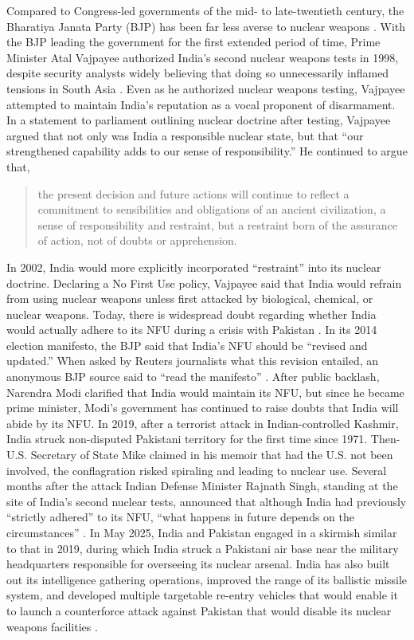 \documentclass[12pt]{article}
\begin{document}
Compared to Congress-led governments of the mid- to late-twentieth century, the Bharatiya Janata Party (BJP) has been far less averse to nuclear weapons \citep{hymans_psychology_2006}. With the BJP leading the government for the first extended period of time, Prime Minister Atal Vajpayee authorized India's second nuclear weapons tests in 1998, despite security analysts widely believing that doing so unnecessarily inflamed tensions in South Asia \citep{bajpai_indian_2014}. Even as he authorized nuclear weapons testing, Vajpayee attempted to maintain India's reputation as a vocal proponent of disarmament. In a statement to parliament outlining nuclear doctrine after testing, Vajpayee argued that not only was India a responsible nuclear state, but that “our strengthened capability adds to our sense of responsibility.” He continued to argue that, \blockquote{the present decision and future actions will  continue to reflect a commitment to sensibilities and  obligations of an ancient civilization, a sense of responsibility and restraint, but a restraint born of the assurance of action, not of doubts or apprehension.}

In 2002, India would more explicitly incorporated “restraint” into its nuclear doctrine. Declaring a No First Use policy, Vajpayee said that India would refrain from using nuclear weapons unless first attacked by biological, chemical, or nuclear weapons. Today, there is widespread doubt regarding whether India would actually adhere to its NFU during a crisis with Pakistan \citep{clary_indias_2019, sundaram_india_2018}. In its 2014 election manifesto, the BJP said that India's NFU should be “revised and updated.” When asked by Reuters journalists what this revision entailed, an anonymous BJP source said to “read the manifesto” \citep{sanjeev_miglani_indias_2014}. After public backlash, Narendra Modi clarified that India would maintain its NFU, but since he became prime minister, Modi's government has continued to raise doubts that India will abide by its NFU. In 2019, after a terrorist attack in Indian-controlled Kashmir, India struck non-disputed Pakistani territory for the first time since 1971. Then-U.S. Secretary of State Mike \citet{pompeo_never_2023}
 claimed in his memoir that had the U.S. not been involved, the conflagration risked spiraling and leading to nuclear use. Several months after the attack Indian Defense Minister Rajnath Singh, standing at the site of India's second nuclear tests, announced that although India had previously “strictly adhered” to its NFU, “what happens in future depends on the circumstances” \citep{.sadf}. In May 2025, India and Pakistan engaged in a skirmish similar to that in 2019, during which India struck a Pakistani air base near the military headquarters responsible for overseeing its nuclear arsenal. India has also built out its intelligence gathering operations, improved the range of its ballistic missile system, and developed multiple targetable re-entry vehicles that would enable it to launch a counterforce attack against Pakistan that would disable its nuclear weapons facilities \citep{clary_indias_2019}.
\end{document}

